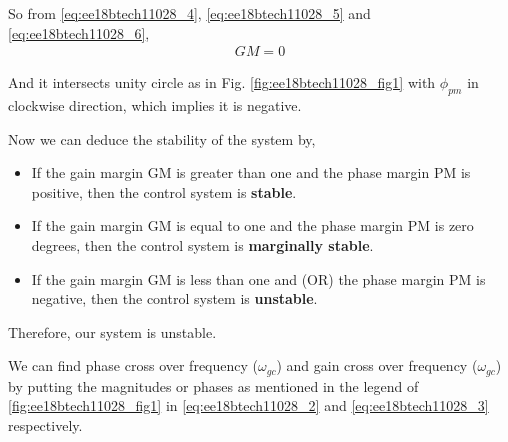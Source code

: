 \begin{enumerate}[label=\thesection.\arabic*.,ref=\thesection.\theenumi]
So from \eqref{eq:ee18btech11028_4}, \eqref{eq:ee18btech11028_5} and \eqref{eq:ee18btech11028_6},
\begin{align}
    GM = 0
\end{align}

And it intersects unity circle as in Fig. \ref{fig:ee18btech11028_fig1} with $\phi_{pm}$ in clockwise direction, which implies it is negative.

Now we can deduce the stability of the system by,
\begin{itemize}
    \item If the gain margin GM is greater than one and the phase margin PM is positive, then the control system is \textbf{stable}.
    \item If the gain margin GM is equal to one and the phase margin PM is zero degrees, then the control system is  \textbf{marginally stable}.
    \item If the gain margin GM is less than one and (OR) the phase margin PM is negative, then the control system is \textbf{unstable}.
\end{itemize}

Therefore, our system is unstable.

We can find phase cross over frequency ($\omega_{gc}$) and gain cross over frequency ($\omega_{gc}$) by putting the magnitudes or phases as mentioned in the legend of \ref{fig:ee18btech11028_fig1} in \eqref{eq:ee18btech11028_2}
and \eqref{eq:ee18btech11028_3} respectively.


\end{enumerate}
